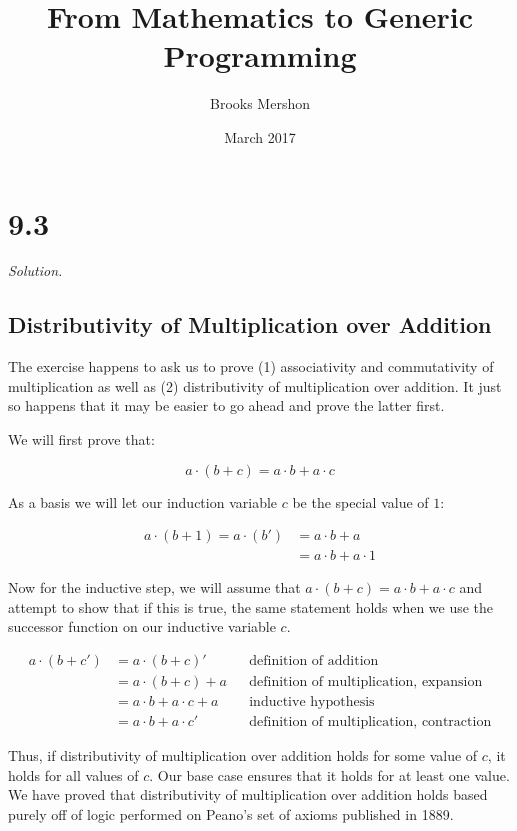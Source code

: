 \documentclass{article}
\title{From Mathematics to Generic Programming}
\author{Brooks Mershon}
\date{March 2017}
\begin{document}
\maketitle

\section*{9.3}

\textit{Solution.}

\subsection*{Distributivity of Multiplication over Addition}

The exercise happens to ask us to prove (1) associativity and commutativity of multiplication as well as (2) distributivity of multiplication over addition. It just so happens that it may be easier to go ahead and prove the latter first.

We will first prove that:

$$a \cdot (b + c) = a \cdot b + a \cdot c$$

As a basis we will let our induction variable $c$ be the special value of $1$:

\begin{align*}
a \cdot (b + 1) = a \cdot (b') &= a \cdot b + a \\
&= a \cdot b + a \cdot 1
\end{align*}

Now for the inductive step, we will assume that $a \cdot (b + c) = a \cdot b + a \cdot c$ and attempt to show that if this is true, the same statement holds when we use the successor function on our inductive variable $c$.

\begin{align*}
a \cdot (b + c') &= a \cdot (b + c)' && \text{definition of addition} \\
&= a \cdot (b + c) + a && \text{definition of multiplication, expansion} \\
&= a \cdot b + a \cdot c + a && \text{inductive hypothesis} \\
&= a \cdot b + a \cdot c' && \text{definition of multiplication, contraction}
\end{align*}

Thus, if distributivity of multiplication over addition holds for some value of $c$, it holds for all values of $c$. Our base case ensures that it holds for at least one value. We have proved that distributivity of multiplication over addition holds based purely off of logic performed on Peano's set of axioms published in 1889.
\end{document}
